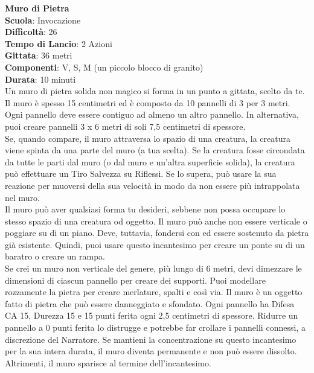 \begin{multicols}{2}
\medskip\textbf{Muro di Pietra}\\
\textbf{Scuola}: Invocazione\\
\textbf{Difficoltà}: 26\\
\textbf{Tempo di Lancio}: 2 Azioni\\
\textbf{Gittata}: 36 metri\\
\textbf{Componenti}: V, S, M (un piccolo blocco di granito)\\
\textbf{Durata}: 10 minuti\\
Un muro di pietra solida non magico si forma in un punto a gittata, scelto da te. Il muro è spesso 15 centimetri ed è composto da 10 pannelli di 3 per 3 metri. Ogni pannello deve essere contiguo ad almeno un altro pannello. In alternativa, puoi creare pannelli 3 x 6 metri di soli 7,5 centimetri di spessore.\\
Se, quando compare, il muro attraversa lo spazio di una creatura, la creatura viene spinta da una parte del muro (a tua scelta). Se la creatura fosse circondata da tutte le parti dal muro (o dal muro e un'altra superficie solida), la creatura può effettuare un Tiro Salvezza su Riflessi. Se lo supera, può usare la sua reazione per muoversi della sua velocità in modo da non essere più intrappolata nel muro.\\
Il muro può aver qualsiasi forma tu desideri, sebbene non possa occupare lo stesso spazio di una creatura od oggetto. Il muro può anche non essere verticale o poggiare su di un piano. Deve, tuttavia, fondersi con ed essere sostenuto da pietra già esistente. Quindi, puoi usare questo incantesimo per creare un ponte su di un baratro o creare un rampa.\\
Se crei un muro non verticale del genere, più lungo di 6 metri, devi dimezzare le dimensioni di ciascun pannello per creare dei supporti. Puoi modellare rozzamente la pietra per creare merlature, spalti e così via. Il muro è un oggetto fatto di pietra che può essere danneggiato e sfondato. Ogni pannello ha Difesa CA 15, Durezza 15 e 15 punti ferita ogni 2,5 centimetri di spessore. Ridurre un pannello a 0 punti ferita lo distrugge e potrebbe far crollare i pannelli connessi, a discrezione del Narratore. Se mantieni la concentrazione su questo incantesimo per la sua intera durata, il muro diventa permanente e non può essere dissolto. Altrimenti, il muro sparisce al termine dell'incantesimo.


\end{multicols}
